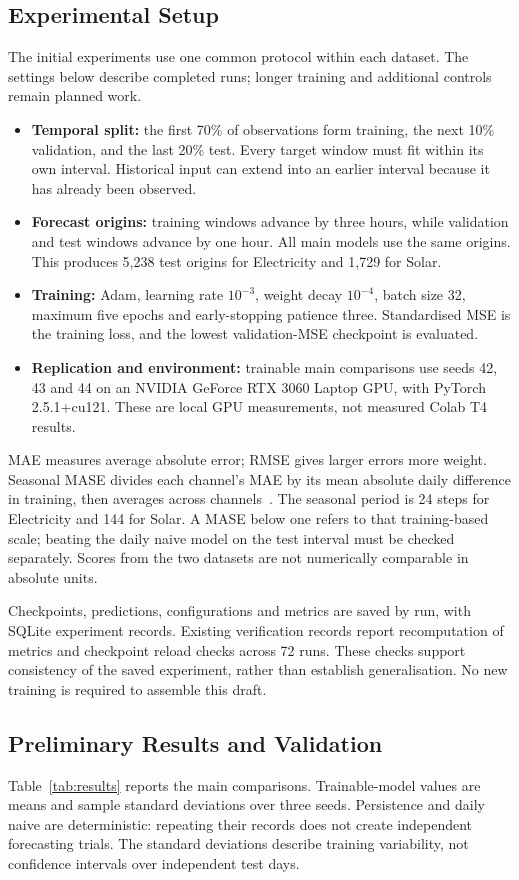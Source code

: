 \documentclass[11pt,a4paper]{article}
\begin{document}
\subsection{Experimental Setup}
The initial experiments use one common protocol within each dataset. The settings below describe completed runs; longer training and additional controls remain planned work.
\begin{itemize}
\item \textbf{Temporal split:} the first 70\% of observations form training, the next 10\% validation, and the last 20\% test. Every target window must fit within its own interval. Historical input can extend into an earlier interval because it has already been observed.
\item \textbf{Forecast origins:} training windows advance by three hours, while validation and test windows advance by one hour. All main models use the same origins. This produces 5,238 test origins for Electricity and 1,729 for Solar.
\item \textbf{Training:} Adam, learning rate $10^{-3}$, weight decay $10^{-4}$, batch size 32, maximum five epochs and early-stopping patience three. Standardised MSE is the training loss, and the lowest validation-MSE checkpoint is evaluated.
\item \textbf{Replication and environment:} trainable main comparisons use seeds 42, 43 and 44 on an NVIDIA GeForce RTX 3060 Laptop GPU, with PyTorch 2.5.1+cu121. These are local GPU measurements, not measured Colab T4 results.
\end{itemize}
MAE measures average absolute error; RMSE gives larger errors more weight. Seasonal MASE divides each channel's MAE by its mean absolute daily difference in training, then averages across channels~\cite{mase}. The seasonal period is 24 steps for Electricity and 144 for Solar. A MASE below one refers to that training-based scale; beating the daily naive model on the test interval must be checked separately. Scores from the two datasets are not numerically comparable in absolute units.

Checkpoints, predictions, configurations and metrics are saved by run, with SQLite experiment records. Existing verification records report recomputation of metrics and checkpoint reload checks across 72 runs. These checks support consistency of the saved experiment, rather than establish generalisation. No new training is required to assemble this draft.

\subsection{Preliminary Results and Validation}
Table~\ref{tab:results} reports the main comparisons. Trainable-model values are means and sample standard deviations over three seeds. Persistence and daily naive are deterministic: repeating their records does not create independent forecasting trials. The standard deviations describe training variability, not confidence intervals over independent test days.
\end{document}
